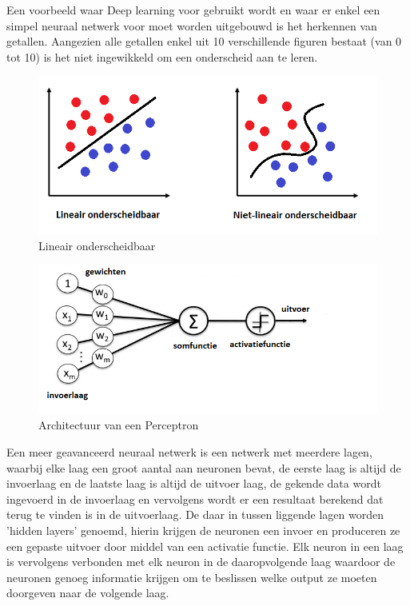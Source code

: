 Een voorbeeld waar Deep learning voor gebruikt wordt en waar er enkel een simpel neuraal netwerk voor moet worden uitgebouwd is het herkennen van getallen.
Aangezien alle getallen enkel uit 10 verschillende figuren bestaat (van 0 tot 10) is het niet ingewikkeld om een onderscheid aan te leren. \autocite{Dann2010}


\begin{figure}
	
	
	\includegraphics[width=\linewidth]{img/Lineair_onderscheidbaar.png}
	\caption{Lineair onderscheidbaar}
    \label{tab:lineair}
	
\end{figure}


\begin{figure}
	
	
	\includegraphics[width=\linewidth]{img/Perceptron.png}
	\caption{Architectuur van een Perceptron}
	\label{tab:perceptron}
\end{figure}

Een meer geavanceerd neuraal netwerk is een netwerk met meerdere lagen, waarbij elke laag een groot aantal aan neuronen bevat, de eerste laag is altijd de invoerlaag en de laatste laag is altijd de uitvoer laag, de gekende data wordt ingevoerd in de invoerlaag en vervolgens wordt er een resultaat berekend dat terug te vinden is in de uitvoerlaag. De daar in tussen liggende lagen worden 'hidden layers' genoemd, hierin krijgen de neuronen een invoer en produceren ze een gepaste uitvoer door middel van een activatie functie.
Elk neuron in een laag is vervolgens verbonden met elk neuron in de daaropvolgende laag waardoor de neuronen genoeg informatie krijgen om te beslissen welke output ze moeten doorgeven naar de volgende laag.

